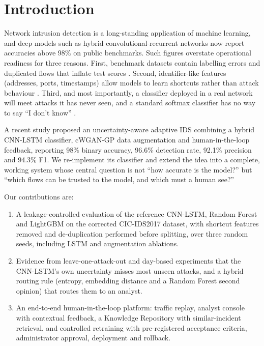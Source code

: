 \documentclass[conference]{IEEEtran}
\begin{document}
\section{Introduction}
Network intrusion detection is a long-standing application of machine learning, and deep models
such as hybrid convolutional-recurrent networks now report accuracies above 98\% on public
benchmarks. Such figures overstate operational readiness for three reasons. First, benchmark
datasets contain labelling errors and duplicated flows that inflate test scores
\cite{engelen2021troubleshooting,liu2022error}. Second, identifier-like features (addresses,
ports, timestamps) allow models to learn shortcuts rather than attack behaviour
\cite{arp2022dos}. Third, and most importantly, a classifier deployed in a real network will meet
attacks it has never seen, and a standard softmax classifier has no way to say ``I don't
know'' \cite{sommer2010outside,hendrycks2017baseline}.

A recent study \cite{refpaper2025} proposed an uncertainty-aware adaptive IDS combining a hybrid
CNN-LSTM classifier, cWGAN-GP data augmentation and human-in-the-loop feedback, reporting 98\%
binary accuracy, 96.6\% detection rate, 92.1\% precision and 94.3\% F1. We re-implement its
classifier and extend the idea into a complete, working system whose central question is not
``how accurate is the model?'' but ``which flows can be trusted to the model, and which must a
human see?''

Our contributions are:
\begin{enumerate}
\item A leakage-controlled evaluation of the reference CNN-LSTM, Random Forest and LightGBM on the
corrected CIC-IDS2017 dataset, with shortcut features removed and de-duplication performed before
splitting, over three random seeds, including LSTM and augmentation ablations.
\item Evidence from leave-one-attack-out and day-based experiments that the CNN-LSTM's own
uncertainty misses most unseen attacks, and a hybrid routing rule (entropy, embedding distance
and a Random Forest second opinion) that routes them to an analyst.
\item An end-to-end human-in-the-loop platform: traffic replay, analyst console with contextual
feedback, a Knowledge Repository with similar-incident retrieval, and controlled retraining with
pre-registered acceptance criteria, administrator approval, deployment and rollback.
\end{enumerate}
\end{document}
